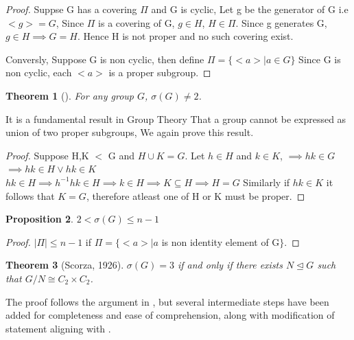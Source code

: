 \documentclass[12pt, a4paper]{article}
\theoremstyle{plain}
\newtheorem{theorem}{Theorem}[section]
\newtheorem{proposition}[theorem]{Proposition}
\theoremstyle{definition}
\newcommand{\sig}{\sigma}
\begin{document}
\begin{proof}
  Suppse G has a covering $\Pi$ and G is cyclic, Let g be the generator of G i.e $<g> = G$, Since $\Pi$ is a covering of G, $g \in H $, $H \in \Pi$. Since g generates G, $g \in H  \implies G = H$. Hence H is not proper and no such covering exist.
  
  Conversly, Suppose G is non cyclic, then define $ \Pi = \{<a>|a \in G\}$ Since G is non cyclic, each $<a>$ is a proper subgroup.


\end{proof}

\begin{theorem}[{\cite[Theorem~2]{velasquez2022}}]
  For any group $G$, $\sig(G) \neq 2$.
\end{theorem}
It is a fundamental result in Group Theory That a group cannot be expressed as union of two proper subgroups, We again prove this result.
\begin{proof}
  
  Suppose H,K $<$ G and $H \cup K = G$.
  Let $h \in H $ and $k \in K$,
  $\implies hk \in G$ 
  $\implies hk \in H \vee hk \in K$\\
   $hk \in H \implies h^{-1}hk \in H \implies k \in H \implies K \subseteq H \implies H = G$
   Similarly  if $hk \in K$ it follows that $K=G$, therefore atleast one of H or K must be proper.

\end{proof}
\begin{proposition}{$2<\sigma(G) \leq n-1$}
\end{proposition}
\begin{proof}
    $|\Pi| \leq n-1 $ if $ \Pi=\{<a>|a$ is non identity element of G$\}. $
\end{proof}
\begin{theorem}[Scorza, 1926]

\label{thm:scorza}
$\sigma(G) = 3$ if and only if there exists $N \trianglelefteq G$ such that
$G/N \cong C_2 \times C_2$.
\end{theorem}
The proof follows the argument in \cite{scorza1926}, but several intermediate steps have been added for completeness and ease of comprehension, along with modification of statement aligning with \cite{velasquez2022}.
\end{document}
